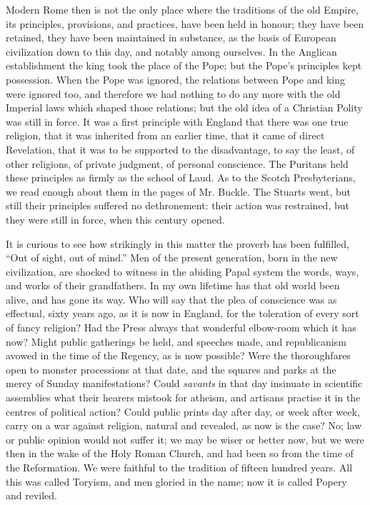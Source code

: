 Modern Rome then is not the only place where the traditions of the
old Empire, its principles, provisions, and practices, have been held in
honour; they have been retained, they have been maintained in substance,
as the basis of European civilization down to this day, and notably
among ourselves. In the Anglican establishment the king took the place
of the Pope; but the Pope's principles kept possession. When the Pope
was ignored, the relations between Pope and king were ignored too, and
therefore we had nothing to do any more with the old Imperial laws which
shaped those relations; but the old idea of a Christian Polity was still
in force. It was a first principle with England that there was one true
religion, that it was inherited from an earlier time, that it came of
direct Revelation, that it was to be supported to the disadvantage, to
say the least, of other religions, of private judgment, of personal
conscience. The Puritans held these principles as firmly as the school
of Laud. As to the Scotch Presbyterians, we read enough about them
in the pages of Mr. Buckle. The Stuarts went, but still their principles
suffered no dethronement: their action was restrained, but they were
still in force, when this century opened.

It is curious to see how strikingly in this matter the proverb has
been fulfilled, ``Out of sight, out of mind.'' Men of the
present generation, born in the new civilization, are shocked to witness
in the abiding Papal system the words, ways, and works of their
grandfathers. In my own lifetime has that old world been alive, and has
gone its way. Who will say that the plea of conscience was as effectual,
sixty years ago, as it is now in England, for the toleration of every
sort of fancy religion? Had the Press always that wonderful elbow-room
which it has now? Might public gatherings be held, and speeches made,
and republicanism avowed in the time of the Regency, as is now possible?
Were the thoroughfares open to monster processions at that date, and the
squares and parks at the mercy of Sunday manifestations? Could \emph{savants}
in that day insinuate in scientific assemblies what their hearers
mistook for atheism, and artisans practise it in the centres of
political action? Could public prints day after day, or week after week,
carry on a war against religion, natural and revealed, as now is the
case? No; law or public opinion would not suffer it; we may be wiser or
better now, but we were then in the wake of the Holy Roman Church, and
had been so from the time of the Reformation. We were faithful to the
tradition of fifteen hundred years. All this was called Toryism, and men
gloried in the name; now it is called Popery and reviled.

